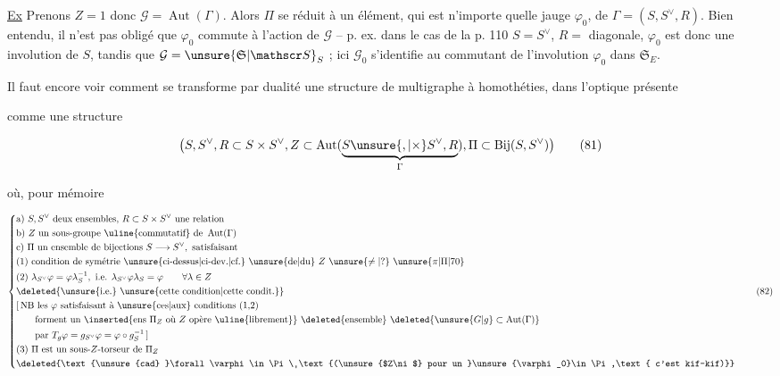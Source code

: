 \uline{Ex} Prenons $Z=1$ donc $\mathcal G=\operatorname{Aut}(\Gamma)$. Alors $\Pi$ se réduit à un élément, qui est n'importe quelle jauge $\varphi_0$, de $\Gamma=(S,S^\vee,R)$. Bien entendu, il n'est pas obligé que $\varphi_0$ commute à l'action de $\mathcal G$ -- p. ex. dans le cas de la p. 110 $S=S^\vee$, $R={}$ diagonale, $\varphi_0$ est donc une involution de $S$, tandis que $\mathcal G=\unsure{\mathfrak S|\mathscr S}_S$ ; ici $\mathcal G_0$ s'identifie au commutant de l'involution $\varphi_0$ dans $\mathfrak S_{E}$. 

Il faut encore voir comment se transforme par dualité une structure de multigraphe  à homothéties,  dans l'optique présente


comme une structure

\[
\bigl(S,S^\vee,R\subset S\times S^\vee,Z\subset\operatorname{Aut}(\underbrace{S\unsure{,|\times}S^\vee,R}_{\Gamma}),\Pi\subset\operatorname{Bij}(S,S^\vee)\bigr)\tag*{(81)}
\]

où, pour mémoire

\[
\left\{\begin{aligned}
&\text{a) } S,S^\vee\text{ deux ensembles, }R\subset S\times S^\vee\text{ une relation}\\
&\text{b) } Z\text{ un sous-groupe \uline{commutatif} de }\operatorname{Aut}(\Gamma)\\
&\text{c) } \Pi\text{ un ensemble de bijections }S\longrightarrow S^\vee,\text{ satisfaisant}\\
&\text{(1) condition de symétrie \unsure{ci-dessus|ci-dev.|cf.} \unsure{de|du} }Z\ \unsure{\ne|?}\ \unsure{\pi|\Pi|70}\\
&\text{(2) }\lambda_{S^\vee}\varphi=\varphi\lambda_S^{-1},\text{ i.e. }\lambda_{S^\vee}\varphi\lambda_S=\varphi\qquad\forall\lambda\in Z\\
&\deleted{\text{\unsure{i.e.} \unsure{cette condition|cette condit.}}}\\
&[\,\mathrm{NB}\ \text{les }\varphi\text{ satisfaisant à \unsure{ces|aux} conditions (1,2)}\\
&\qquad\text{forment un }\inserted{\text{ens }\Pi_Z\ \text{où }Z\text{ opère \uline{librement}}}\ \deleted{\text{ensemble}}\ \deleted{\unsure{G|g}\subset\operatorname{Aut}(\Gamma)}\\
&\qquad\text{par }T_g\varphi=g_{S^\vee}\varphi=\varphi\circ g_S^{-1}\,]\\
&\text{(3) }\Pi\text{ est un sous-}Z\text{-torseur de }\Pi_Z\\
&\deleted{\text{\unsure{cad} }\forall\varphi\in\Pi\ \text{(\unsure{$Z\ni$} pour un }\unsure{\varphi_0}\in\Pi,\text{ c'est kif-kif)}}
\end{aligned}\right.\tag*{(82)}
\]

